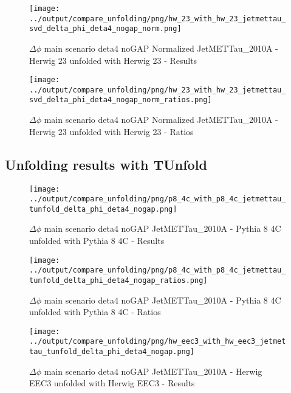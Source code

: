 \documentclass[11pt]{book}
\begin{document}
\begin{figure}[ht]
\centering
\texttt{[image: ../output/compare\_unfolding/png/hw\_23\_with\_hw\_23\_jetmettau\_svd\_delta\_phi\_deta4\_nogap\_norm.png]}
\caption{$\Delta\phi$ main scenario deta4 noGAP Normalized JetMETTau\_2010A - Herwig 23 unfolded with Herwig 23 - Results}
\label{hw_23_hw_23_jetmettau_svd_delta_phi_deta4_nogap_norm_a}
\end{figure}

\begin{figure}[ht]
\centering
\texttt{[image: ../output/compare\_unfolding/png/hw\_23\_with\_hw\_23\_jetmettau\_svd\_delta\_phi\_deta4\_nogap\_norm\_ratios.png]}
\caption{$\Delta\phi$ main scenario deta4 noGAP Normalized JetMETTau\_2010A - Herwig 23 unfolded with Herwig 23 - Ratios}
\label{hw_23_hw_23_jetmettau_svd_delta_phi_deta4_nogap_norm_b}
\end{figure}




\clearpage
\subsection{Unfolding results with TUnfold}

\begin{figure}[ht]
\centering
\texttt{[image: ../output/compare\_unfolding/png/p8\_4c\_with\_p8\_4c\_jetmettau\_tunfold\_delta\_phi\_deta4\_nogap.png]}
\caption{$\Delta\phi$ main scenario deta4 noGAP JetMETTau\_2010A - Pythia 8 4C unfolded with Pythia 8 4C - Results}
\label{p8_p8_jetmettau_tunfold_delta_phi_deta4_nogap_a}
\end{figure}

\begin{figure}[ht]
\centering
\texttt{[image: ../output/compare\_unfolding/png/p8\_4c\_with\_p8\_4c\_jetmettau\_tunfold\_delta\_phi\_deta4\_nogap\_ratios.png]}
\caption{$\Delta\phi$ main scenario deta4 noGAP JetMETTau\_2010A - Pythia 8 4C unfolded with Pythia 8 4C - Ratios}
\label{p8_p8_jetmettau_tunfold_delta_phi_deta4_nogap_b}
\end{figure}

\begin{figure}[ht]
\centering
\texttt{[image: ../output/compare\_unfolding/png/hw\_eec3\_with\_hw\_eec3\_jetmettau\_tunfold\_delta\_phi\_deta4\_nogap.png]}
\caption{$\Delta\phi$ main scenario deta4 noGAP JetMETTau\_2010A - Herwig EEC3 unfolded with Herwig EEC3 - Results}
\label{hw_eec3_hw_eec3_jetmettau_tunfold_delta_phi_deta4_nogap_a}
\end{figure}
\end{document}
